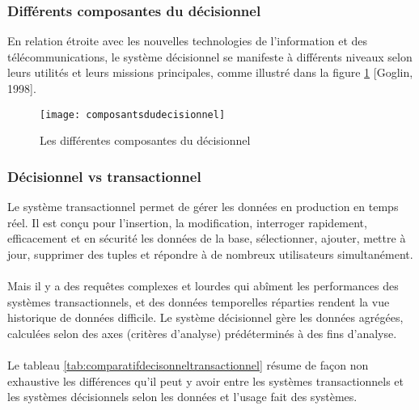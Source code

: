 \subsubsection{Différents composantes du décisionnel}
En relation étroite avec les nouvelles technologies de l’information et des télécommunications, le système décisionnel se manifeste à différents niveaux selon leurs utilités et leurs missions principales, comme illustré dans la figure \ref{fig:composantsdudecisionnel} [Goglin, 1998].

\begin{figure}[H]
    \centering
    \texttt{[image: composantsdudecisionnel]}
    \caption{Les différentes composantes du décisionnel}
    \label{fig:composantsdudecisionnel}
\end{figure}

\subsubsection{Décisionnel vs transactionnel}
Le système transactionnel permet de gérer les données en production en temps réel. Il est conçu pour l’insertion, la modification, interroger rapidement, efficacement et en sécurité les données de la base, sélectionner, ajouter, mettre à jour, supprimer des tuples et répondre à de nombreux utilisateurs simultanément.
\paragraph{}
Mais il y a des requêtes complexes et lourdes qui abîment les performances des systèmes transactionnels, et des données temporelles réparties rendent la vue historique de données difficile. Le système décisionnel gère les données agrégées, calculées selon des axes (critères d’analyse) prédéterminés à des fins d’analyse.
\paragraph{}
Le tableau \ref{tab:comparatifdecisonneltransactionnel} résume de façon non exhaustive les différences qu’il peut y avoir entre les systèmes transactionnels et les systèmes décisionnels selon les données et l’usage fait des systèmes.

